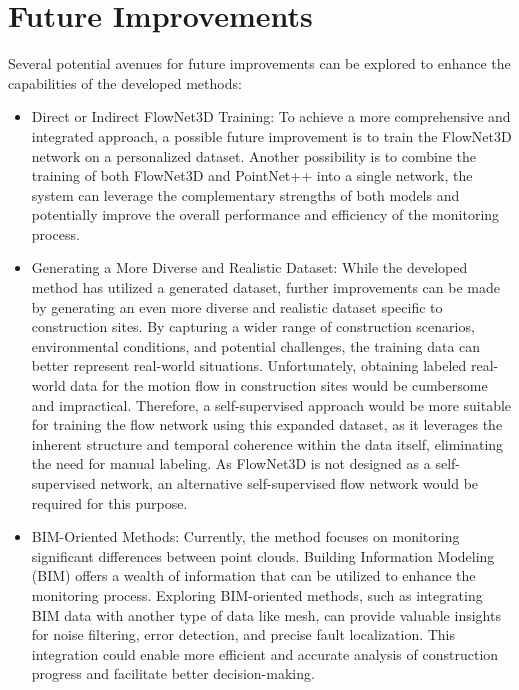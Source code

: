 \section{Future Improvements}
Several potential avenues for future improvements can be explored to enhance the capabilities of the developed methods:
\begin{itemize}
    \item Direct or Indirect FlowNet3D Training: To achieve a more comprehensive and integrated approach, a possible future improvement is to train the FlowNet3D network on a personalized dataset. Another possibility is to combine the training of both FlowNet3D and PointNet++ into a single network, the system can leverage the complementary strengths of both models and potentially improve the overall performance and efficiency of the monitoring process.
    
    \item Generating a More Diverse and Realistic Dataset: While the developed method has utilized a generated dataset, further improvements can be made by generating an even more diverse and realistic dataset specific to construction sites. By capturing a wider range of construction scenarios, environmental conditions, and potential challenges, the training data can better represent real-world situations. Unfortunately, obtaining labeled real-world data for the motion flow in construction sites would be cumbersome and impractical. Therefore, a self-supervised approach would be more suitable for training the flow network using this expanded dataset, as it leverages the inherent structure and temporal coherence within the data itself, eliminating the need for manual labeling. As FlowNet3D is not designed as a self-supervised network, an alternative self-supervised flow network would be required for this purpose.

    \item BIM-Oriented Methods: Currently, the method focuses on monitoring significant differences between point clouds. Building Information Modeling (BIM) offers a wealth of information that can be utilized to enhance the monitoring process. Exploring BIM-oriented methods, such as integrating BIM data with another type of data like mesh, can provide valuable insights for noise filtering, error detection, and precise fault localization. This integration could enable more efficient and accurate analysis of construction progress and facilitate better decision-making.
    

\end{itemize}
